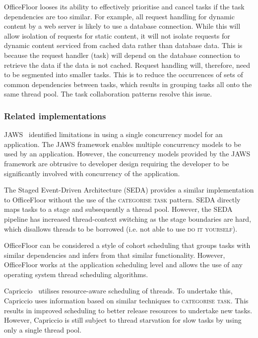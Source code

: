 \documentclass[prodmode]{style/acmlarge}
\begin{document}
OfficeFloor looses its ability to effectively prioritise and cancel tasks if the
task dependencies are too similar.  For example, all request handling for
dynamic content by a web server is likely to use a database connection.  While
this will allow isolation of requests for static content, it will not isolate
requests for dynamic content serviced from cached data rather than database
data.  This is because the request handler (task) will depend on the database
connection to retrieve the data if the data is not cached.  Request handling
will, therefore, need to be segmented into smaller tasks.  This is to reduce the
occurrences of sets of common dependencies between tasks, which results in
grouping tasks all onto the same thread pool.  The task collaboration patterns
resolve this issue.


\subsubsection*{Related implementations}

JAWS~\cite{jaws} identified limitations in using a single concurrency model for
an application.  The JAWS framework enables multiple concurrency models to be
used by an application.  However, the concurrency models provided by the JAWS
framework are obtrusive to developer design requiring the developer to be
significantly involved with concurrency of the application.

The Staged Event-Driven Architecture (SEDA) \cite{seda} provides a similar
implementation to OfficeFloor without the use of the \textsc{categorise task}
pattern.  SEDA directly maps tasks to a stage and subsequently a thread pool.
However, the SEDA pipeline has increased thread-context switching as the stage
boundaries are hard, which disallows threads to be borrowed (i.e. not able to
use \textsc{do it yourself}).

OfficeFloor can be considered a style of cohort scheduling \cite{cohort}
that groups tasks with similar dependencies and infers from that similar
functionality.  However, OfficeFloor works at the application scheduling
level and allows the use of any operating system thread scheduling algorithms.

Capriccio~\cite{capriccio} utilises resource-aware scheduling of threads.  To
undertake this, Capriccio uses information based on similar techniques to
\textsc{categorise task}.  This results in improved scheduling to better release
resources to undertake new tasks.  However, Capriccio is still subject to thread
starvation for slow tasks by using only a single thread pool.
\end{document}
